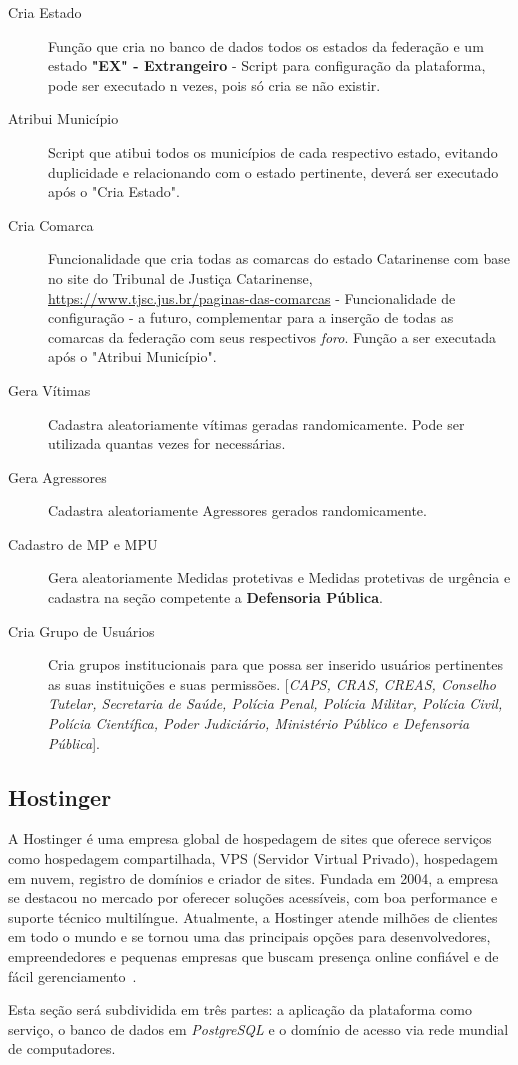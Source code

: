 \begin{description}
   \item [Cria Estado] Função que cria no banco de dados todos os estados da federação e um estado \textbf{"EX" - Extrangeiro} - Script para configuração da plataforma, pode ser executado n vezes, pois só cria se não existir.
   \item [Atribui Município] Script que atibui todos os municípios de cada respectivo estado, evitando duplicidade e relacionando com o estado pertinente, deverá ser executado após o "Cria Estado".
   \item [Cria Comarca] Funcionalidade que cria todas as comarcas do estado Catarinense com base no site do Tribunal de Justiça Catarinense, \href{https://www.tjsc.jus.br/paginas-das-comarcas}{https://www.tjsc.jus.br/paginas-das-comarcas} - Funcionalidade de configuração - a futuro, complementar para a inserção de todas as comarcas da federação com seus respectivos \textit{foro}. Função a ser executada após o "Atribui Município".
   \item [Gera Vítimas] Cadastra aleatoriamente vítimas geradas randomicamente. Pode ser utilizada quantas vezes for necessárias.
   \item [Gera Agressores] Cadastra aleatoriamente Agressores gerados randomicamente.
   \item [Cadastro de MP e MPU] Gera aleatoriamente Medidas protetivas e Medidas protetivas de urgência e cadastra na seção competente a \textbf{Defensoria Pública}.
   \item [Cria Grupo de Usuários] Cria grupos institucionais para que possa ser inserido usuários pertinentes as suas instituições e suas permissões. [\textit{CAPS, CRAS, CREAS, Conselho Tutelar, Secretaria de Saúde, Polícia Penal, Polícia Militar, Polícia Civil, Polícia Científica, Poder Judiciário, Ministério Público e Defensoria Pública}].
 \end{description}



\subsection{Hostinger}
\par A Hostinger é uma empresa global de hospedagem de sites que oferece serviços como hospedagem compartilhada, VPS (Servidor Virtual Privado), hospedagem em nuvem, registro de domínios e criador de sites. Fundada em 2004, a empresa se destacou no mercado por oferecer soluções acessíveis, com boa performance e suporte técnico multilíngue. Atualmente, a Hostinger atende milhões de clientes em todo o mundo e se tornou uma das principais opções para desenvolvedores, empreendedores e pequenas empresas que buscam presença online confiável e de fácil gerenciamento~\cite{hostinger2025}.
\par Esta seção será subdividida em três partes: a aplicação da plataforma como serviço, o banco de dados em \textit{PostgreSQL} e o domínio de acesso via rede mundial de computadores.


